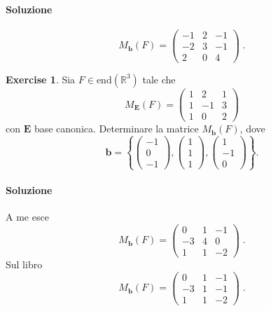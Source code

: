 \documentclass{article}
\theoremstyle{plain}
\theoremstyle{definition}
\newtheorem{xca}[exmp]{Exercise}
\theoremstyle{remark}
\begin{document}
\paragraph{Soluzione}
\[M_\mathbf{b}(F)=
\begin{pmatrix}
    -1&2&-1\\
    -2&3&-1\\
    2&0&4
\end{pmatrix}\;.\]

\vspace{10pt}

\begin{bxthm}
\begin{xca}
    Sia $F\in\mathrm{end}(\mathbb{R}^3)$ tale che 
    \[M_\mathbf{E}(F)=
    \begin{pmatrix}
        1&2&1\\
        1&-1&3\\
        1&0&2
    \end{pmatrix}\]
    con $\mathbf{E}$ base canonica. Determinare la matrice $M_\mathbf{b}(F)$, dove
    \[\mathbf{b}=\left\{\begin{pmatrix}-1\\0\\-1\end{pmatrix},\begin{pmatrix}1\\1\\1\end{pmatrix},\begin{pmatrix}1\\-1\\0\end{pmatrix}\right\}.\]
\end{xca}
\end{bxthm}
\paragraph{Soluzione}
A me esce
\[M_\mathbf{b}(F)=
\begin{pmatrix}
    0&1&-1\\
    -3&4&0\\
    1&1&-2
\end{pmatrix}\;.\]
Sul libro 
\[M_\mathbf{b}(F)=
\begin{pmatrix}
    0&1&-1\\
    -3&1&-1\\
    1&1&-2
\end{pmatrix}\;.\]

\vspace{10pt}
\end{document}
